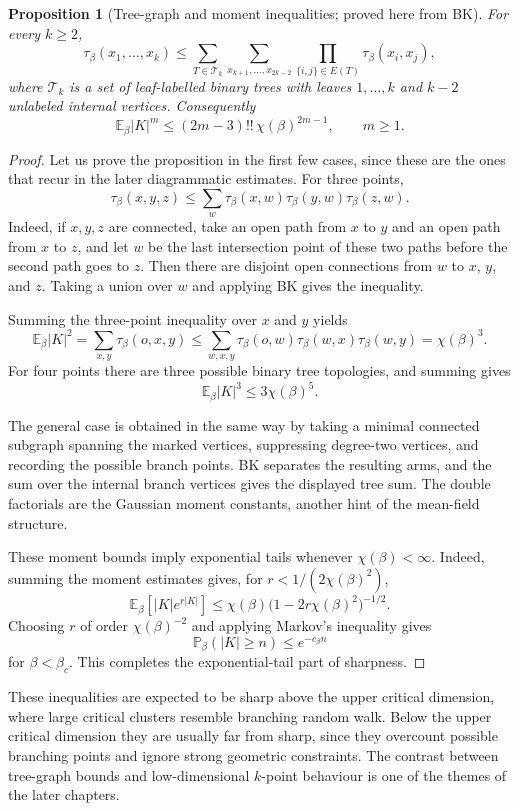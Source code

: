 \documentclass[11pt,reqno]{book}
\numberwithin{equation}{chapter}
\theoremstyle{plain}
\newtheorem{prop}[theorem]{Proposition}
\theoremstyle{definition}
\theoremstyle{remark}
\newcommand{\Pb}{\mathbb P_\beta}
\newcommand{\Eb}{\mathbb E_\beta}
\newcommand{\1}{\mathbf 1}
\begin{document}
\begin{prop}[Tree-graph and moment inequalities; proved here from BK]
For every \(k\geq2\),
\[
  \tau_\beta(x_1,\ldots,x_k)
  \leq
  \sum_{T\in\mathcal T_k}
  \sum_{x_{k+1},\ldots,x_{2k-2}}
  \prod_{\{i,j\}\in E(T)}\tau_\beta(x_i,x_j),
\]
where \(\mathcal T_k\) is a set of leaf-labelled binary trees with leaves
\(1,\ldots,k\) and \(k-2\) unlabeled internal vertices. Consequently
\[
  \Eb |K|^m
  \leq
  (2m-3)!!\,\chi(\beta)^{2m-1},
  \qquad m\geq 1.
\]
\end{prop}

\begin{proof}
Let us prove the proposition in the first few cases, since these are the
ones that recur in the later diagrammatic estimates. For three points,
\[
  \tau_\beta(x,y,z)
  \leq
  \sum_w
  \tau_\beta(x,w)\tau_\beta(y,w)\tau_\beta(z,w).
\]
Indeed, if $x,y,z$ are connected, take an open path from $x$ to $y$ and an open path from $x$ to $z$, and let $w$ be the last intersection point of these two paths before the second path goes to $z$. Then there are disjoint open connections from $w$ to $x$, $y$, and $z$. Taking a union over $w$ and applying BK gives the inequality.

Summing the three-point inequality over $x$ and $y$ yields
\[
  \Eb |K|^2
  =
  \sum_{x,y}\tau_\beta(o,x,y)
  \leq
  \sum_{w,x,y}
  \tau_\beta(o,w)\tau_\beta(w,x)\tau_\beta(w,y)
  =
  \chi(\beta)^3.
\]
For four points there are three possible binary tree topologies, and summing gives
\[
  \Eb |K|^3\leq 3\chi(\beta)^5.
\]

The general case is obtained in the same way by taking a minimal connected
subgraph spanning the marked vertices, suppressing degree-two vertices, and
recording the possible branch points. BK separates the resulting arms, and
the sum over the internal branch vertices gives the displayed tree sum. The
double factorials are the Gaussian moment constants, another hint of the
mean-field structure.

These moment bounds imply exponential tails whenever $\chi(\beta)<\infty$. Indeed, summing the moment estimates gives, for $r<1/(2\chi(\beta)^2)$,
\[
  \Eb[|K|e^{r|K|}]
  \leq
  \chi(\beta)\bigl(1-2r\chi(\beta)^2\bigr)^{-1/2}.
\]
Choosing $r$ of order $\chi(\beta)^{-2}$ and applying Markov's inequality gives
\[
  \Pb(|K|\geq n)\leq e^{-c_\beta n}
\]
for $\beta<\beta_c$. This completes the exponential-tail part of sharpness.
\end{proof}

These inequalities are expected to be sharp above the upper critical dimension, where large critical clusters resemble branching random walk. Below the upper critical dimension they are usually far from sharp, since they overcount possible branching points and ignore strong geometric constraints. The contrast between tree-graph bounds and low-dimensional $k$-point behaviour is one of the themes of the later chapters.
\end{document}
